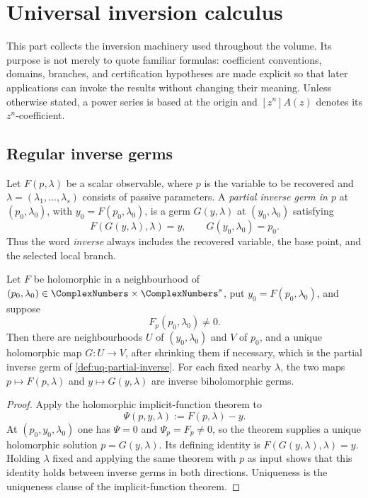 \chapter{Universal inversion calculus}
\label{chap:universal-inversion}

This part collects the inversion machinery used throughout the volume.  Its
purpose is not merely to quote familiar formulas: coefficient conventions,
domains, branches, and certification hypotheses are made explicit so that
later applications can invoke the results without changing their meaning.
Unless otherwise stated, a power series is based at the origin and
\([z^n]A(z)\) denotes its \(z^n\)-coefficient.

\section{Regular inverse germs}
\label{sec:uq-regular-germs}

\begin{definition}
\label{def:uq-partial-inverse}
Let \(F(p,\lambda)\) be a scalar observable, where \(p\) is the variable to be
recovered and \(\lambda=(\lambda_1,\ldots,\lambda_s)\) consists of passive
parameters.  A \emph{partial inverse germ in \(p\)} at
\((p_0,\lambda_0)\), with \(y_0=F(p_0,\lambda_0)\), is a germ
\(G(y,\lambda)\) at \((y_0,\lambda_0)\) satisfying
\[
 F(G(y,\lambda),\lambda)=y,
 \qquad
 G(y_0,\lambda_0)=p_0.
\]
Thus the word \emph{inverse} always includes the recovered variable, the
base point, and the selected local branch.
\end{definition}

\begin{theorem}
\label{thm:uq-regular-analytic-inverse}
Let \(F\) be holomorphic in a neighbourhood of
\((p_0,\lambda_0)\in\ComplexNumbers\times\ComplexNumbers^s\), put
\(y_0=F(p_0,\lambda_0)\), and suppose
\[
 F_p(p_0,\lambda_0)\ne0.
\]
Then there are neighbourhoods \(U\) of \((y_0,\lambda_0)\) and \(V\) of
\(p_0\), and a unique holomorphic map \(G\colon U\to V\), after shrinking
them if necessary, which is the partial inverse germ of
\cref{def:uq-partial-inverse}.  For each fixed nearby \(\lambda\), the two
maps \(p\mapsto F(p,\lambda)\) and \(y\mapsto G(y,\lambda)\) are inverse
biholomorphic germs.
\end{theorem}

\begin{proof}
Apply the holomorphic implicit-function theorem to
\[
 \Psi(p,y,\lambda):=F(p,\lambda)-y.
\]
At \((p_0,y_0,\lambda_0)\) one has \(\Psi=0\) and
\(\Psi_p=F_p\ne0\), so the theorem supplies a unique holomorphic solution
\(p=G(y,\lambda)\).  Its defining identity is
\(F(G(y,\lambda),\lambda)=y\).  Holding \(\lambda\) fixed and applying the
same theorem with \(p\) as input shows that this identity holds between
inverse germs in both directions.  Uniqueness is the uniqueness clause of
the implicit-function theorem.
\end{proof}

